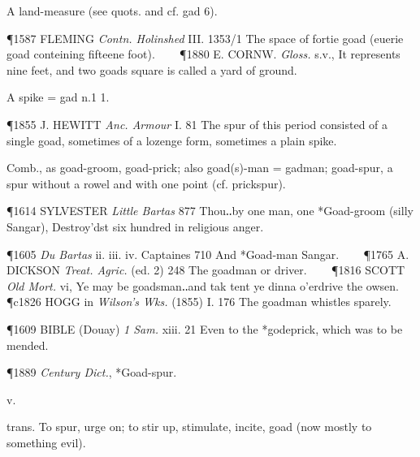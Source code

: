 \begin{description}[wide, labelwidth=!, labelindent=0pt]
\begin{myenumerate}
 A land-measure (see quots. and cf. gad 6).

\P 1587 FLEMING  \textit{Contn. Holinshed} III. 1353/1 The space of fortie goad (euerie goad conteining fifteene foot).    
\P 1880 E. CORNW.  \textit{Gloss.} s.v., It represents nine feet, and two goads square is called a yard of ground.

 A spike = gad n.1 1.

\P 1855 J. HEWITT  \textit{Anc. Armour} I. 81 The spur of this period consisted of a single goad, sometimes of a lozenge form, sometimes a plain spike.

 Comb., as goad-groom, goad-prick; also goad(s)-man = gadman; goad-spur, a spur without a rowel and with one point (cf. prickspur).

\P 1614 SYLVESTER  \textit{Little Bartas} 877 Thou‥by one man, one *Goad-groom (silly Sangar), Destroy'dst six hundred in religious anger.

\P 1605 \textit{Du Bartas} ii. iii. iv. Captaines 710 And *Goad-man Sangar.    
\P 1765 A. DICKSON  \textit{Treat. Agric.} (ed. 2) 248 The goadman or driver.    
\P 1816 SCOTT  \textit{Old Mort.} vi, Ye may be goadsman‥and tak tent ye dinna o'erdrive the owsen.
\P c1826 HOGG in  \textit{Wilson's Wks.} (1855) I. 176 The goadman whistles sparely.

\P 1609 BIBLE (Douay)  \textit{1 Sam.} xiii. 21 Even to the *godeprick, which was to be mended.

\P 1889 \textit{Century Dict.}, *Goad-spur.
\end{myenumerate}

 v.

\noindent {}

\vspace{-0.3cm}

\begin{myenumerate}

 trans. To spur, urge on; to stir up, stimulate, incite, goad (now mostly to something evil).


\end{myenumerate}
\end{description}

